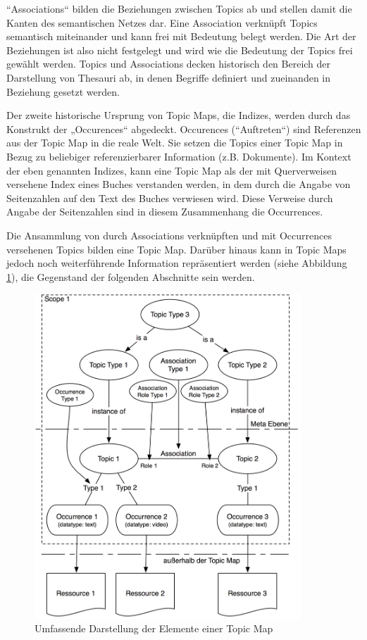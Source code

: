 “Associations“ bilden die Beziehungen zwischen Topics ab und stellen damit die Kanten des semantischen Netzes dar. Eine Association verknüpft Topics semantisch miteinander und kann frei mit Bedeutung belegt werden. Die Art der Beziehungen ist also nicht festgelegt und wird wie die Bedeutung der Topics frei gewählt werden. Topics und Associations decken historisch den Bereich der Darstellung von Thesauri ab, in denen Begriffe definiert und zueinanden in Beziehung gesetzt werden. 

Der zweite historische Ursprung von Topic Maps, die Indizes, werden durch das Konstrukt der „Occurences“ abgedeckt. Occurences (“Auftreten“) sind Referenzen aus der Topic Map in die reale Welt. Sie setzen die Topics einer Topic Map in Bezug zu beliebiger referenzierbarer Information (z.B. Dokumente). Im Kontext der eben genannten Indizes, kann eine Topic Map als der mit Querverweisen versehene Index eines Buches verstanden werden, in dem durch die Angabe von Seitenzahlen auf den Text des Buches verwiesen wird. Diese Verweise durch Angabe der Seitenzahlen sind in diesem Zusammenhang die Occurrences.

Die Ansammlung von durch Associations verknüpften und mit Occurrences versehenen Topics bilden eine Topic Map. Darüber hinaus kann in Topic Maps jedoch noch weiterführende Information repräsentiert werden (siehe Abbildung \ref{fig:img_Persistenz_TMFull}), die Gegenstand der folgenden Abschnitte sein werden.

\begin{figure}[htbp]
	\centering
		\includegraphics[width=10cm]{img/Persistenz/TMFull.png}
	\caption{Umfassende Darstellung der Elemente einer Topic Map}
	\label{fig:img_Persistenz_TMFull}
\end{figure}

